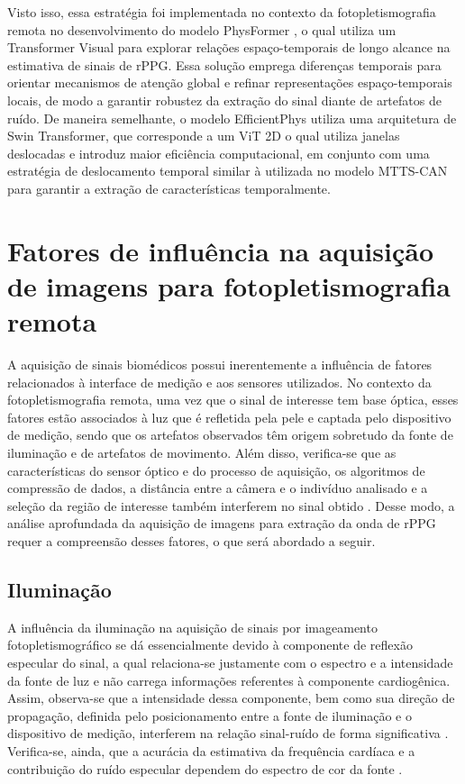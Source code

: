 Visto isso, essa estratégia foi implementada no contexto da fotopletismografia remota no desenvolvimento do modelo PhysFormer \cite{yu2022physformer}, o qual utiliza um Transformer Visual para explorar relações espaço-temporais de longo alcance na estimativa de sinais de rPPG. Essa solução emprega diferenças temporais para orientar mecanismos de atenção global e refinar representações espaço-temporais locais, de modo a garantir robustez da extração do sinal diante de artefatos de ruído. De maneira semelhante, o modelo EfficientPhys \cite{liu2023efficientphys} utiliza uma arquitetura de Swin Transformer, que corresponde a um ViT 2D o qual utiliza janelas deslocadas e introduz maior eficiência computacional, em conjunto com uma estratégia de deslocamento temporal similar à utilizada no modelo MTTS-CAN \cite{liu2020multi} para garantir a extração de características temporalmente. 

\section{Fatores de influência na aquisição de imagens para fotopletismografia remota}
\label{sec:influencing-factors}

A aquisição de sinais biomédicos possui inerentemente a influência de fatores relacionados à interface de medição e aos sensores utilizados. No contexto da fotopletismografia remota, uma vez que o sinal de interesse tem base óptica, esses fatores estão associados à luz que é refletida pela pele e captada pelo dispositivo de medição, sendo que os artefatos observados têm origem sobretudo da fonte de iluminação e de artefatos de movimento. Além disso, verifica-se que as características do sensor óptico e do processo de aquisição, os algoritmos de compressão de dados, a distância entre a câmera e o indivíduo analisado e a seleção da região de interesse também interferem no sinal obtido \cite{mcduff2015survey, sinhal2019overview}. Desse modo, a análise aprofundada da aquisição de imagens para extração da onda de rPPG requer a compreensão desses fatores, o que será abordado a seguir. 

\subsection{Iluminação}

A influência da iluminação na aquisição de sinais por imageamento fotopletismográfico se dá essencialmente devido à componente de reflexão especular do sinal, a qual relaciona-se justamente com o espectro e a intensidade da fonte de luz e não carrega informações referentes à componente cardiogênica. Assim, observa-se que a intensidade dessa componente, bem como sua direção de propagação, definida pelo posicionamento entre a fonte de iluminação e o dispositivo de medição, interferem na relação sinal-ruído de forma significativa \cite{guler2022effects, fan2024remote}. Verifica-se, ainda, que
a acurácia da estimativa da frequência cardíaca e a contribuição do ruído especular dependem do espectro de cor da fonte \cite{lin2017study}. 

